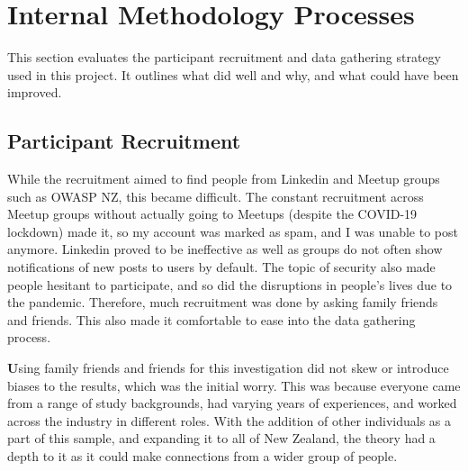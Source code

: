 \section{Internal Methodology Processes}

This section evaluates the participant recruitment and data gathering strategy used in this project. It outlines what did well and why, and what could have been improved. 

\subsection{Participant Recruitment}

While the recruitment aimed to find people from Linkedin and Meetup groups such as OWASP NZ, this became difficult. The constant recruitment across Meetup groups without actually going to Meetups (despite the COVID-19 lockdown) made it, so my account was marked as spam, and I was unable to post anymore. Linkedin proved to be ineffective as well as groups do not often show notifications of new posts to users by default. The topic of security also made people hesitant to participate, and so did the disruptions in people's lives due to the pandemic. Therefore, much recruitment was done by asking family friends and friends. This also made it comfortable to ease into the data gathering process.
\newline
\par\textbf
Using family friends and friends for this investigation did not skew or introduce biases to the results, which was the initial worry. This was because everyone came from a range of study backgrounds, had varying years of experiences, and worked across the industry in different roles. With the addition of other individuals as a part of this sample, and expanding it to all of New Zealand, the theory had a depth to it as it could make connections from a wider group of people.


